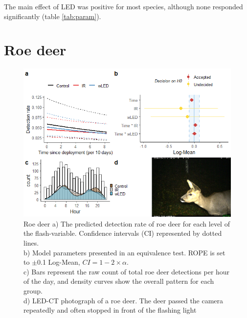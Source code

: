 The main effect of LED was positive for most species, although none responded significantly (table \ref{tab:param}).

\begin{table}[ht]  %
\caption[Model parameters]
{\label{tab:param} Model parameters%
Results of generalised linear mixed effect models on detection rate of species at 56 different locations in south-eastern Norway,%
}
\small


 
%


\clearpage %

\section{Roe deer}

\begin{figure}
\centering
	\includegraphics[scale=.9]{../R/glmm_sp_files/figure-html/parameters-1.png}
\caption[Roe deer]
{Roe deer %
 a) The predicted detection rate of roe deer for each level of the flash-variable. Confidence intervals (CI) represented by dotted lines.\\
b) Model parameters presented in an equivalence test. ROPE is set to $\pm$0.1 Log-Mean, $CI =1 - 2\times \alpha$.\\ 
c) Bars represent the raw count of total roe deer detections per hour of the day, and density curves show the overall pattern for each group.\\
d) LED-CT photograph of a roe deer. The deer passed the camera repeatedly and often stopped in front of the flashing light}\label{fig:raadyr}
\end{figure}



\end{table}
